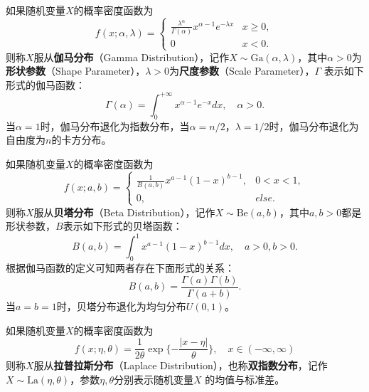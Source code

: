 \begin{definition}[伽马分布]
如果随机变量$X$的概率密度函数为
\begin{equation}
    f(x;\alpha,\lambda) = \left\{
    \begin{array}{cc}
        \frac{\lambda^\alpha}{\Gamma(\alpha)} x^{\alpha-1} e^{-\lambda x} & x \ge 0,\\
        0 & x < 0.
    \end{array}
    \right.
\end{equation}
则称$X$服从\textbf{伽马分布}（Gamma Distribution），记作$X\sim \mathrm{Ga}(\alpha,\lambda)$，其中$\alpha>0$为\textbf{形状参数}（Shape Parameter），$\lambda>0$为\textbf{尺度参数}（Scale Parameter），$\Gamma$ 表示如下形式的伽马函数：
\begin{equation}
    \Gamma(\alpha) = \int_0^{+\infty} x^{\alpha-1} e^{-x} dx,\quad \alpha>0.
\end{equation}
当$\alpha=1$时，伽马分布退化为指数分布，当$\alpha=n/2$，$\lambda=1/2$时，伽马分布退化为自由度为$n$的卡方分布。
\end{definition}

\begin{definition}[贝塔分布]
如果随机变量$X$的概率密度函数为
\begin{equation}
    f(x;a,b) = \left\{
    \begin{array}{rl}
        \frac{1}{B(a,b)} x^{a-1} (1- x)^{b-1}, & 0 < x < 1,\\
        0, & else.
    \end{array}
    \right.
\end{equation}
则称$X$服从\textbf{贝塔分布}（Beta Distribution），记作$X\sim \mathrm{Be}(a,b)$，其中$a,b>0$都是形状参数，$B$表示如下形式的贝塔函数：
\begin{equation}
    B(a,b) = \int_0^1 x^{a-1} (1-x)^{b-1} dx,\quad a>0,b>0.
\end{equation}
根据伽马函数的定义可知两者存在下面形式的关系：
\begin{equation}
    B(a,b) = \frac{\Gamma(a)\Gamma(b)}{\Gamma(a+b)}.
\end{equation}
当$a=b=1$时，贝塔分布退化为均匀分布$U(0,1)$。
\end{definition}

\begin{definition}[拉普拉斯分布]
如果随机变量$X$的概率密度函数为
\begin{equation}
    f(x;\eta,\theta) = \frac{1}{2\theta} \exp\{-\frac{|x-\eta|}{\theta}\},\quad x \in (-\infty,\infty)
\end{equation}
则称$X$服从\textbf{拉普拉斯分布}（Laplace Distribution），也称\textbf{双指数分布}，记作$X\sim \mathrm{La}(\eta,\theta)$，参数$\eta,\theta$分别表示随机变量$X$ 的均值与标准差。
\end{definition}

